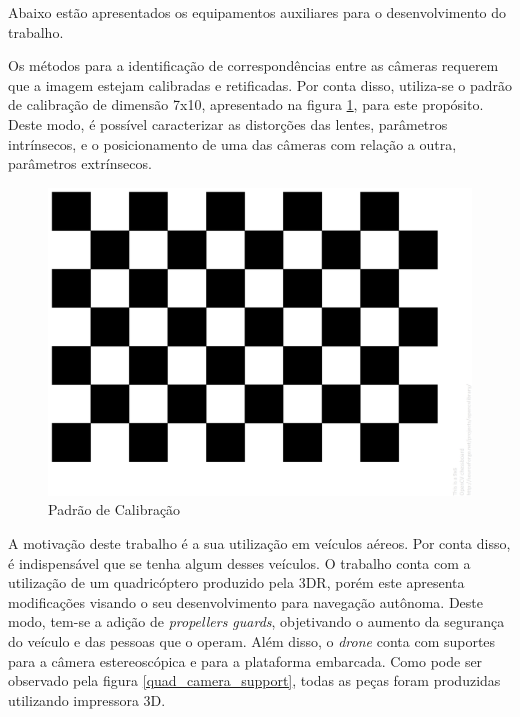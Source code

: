 Abaixo estão apresentados os equipamentos auxiliares para o desenvolvimento do trabalho. 

Os métodos para a identificação de correspondências entre as câmeras requerem que a imagem estejam calibradas e retificadas. Por conta disso, utiliza-se o padrão de calibração de dimensão 7x10, apresentado na figura \ref{calibration_pattern}, para este propósito. Deste modo, é possível caracterizar as distorções das lentes, parâmetros intrínsecos, e o posicionamento de uma das câmeras com relação a outra, parâmetros extrínsecos.  

\begin{figure}[H]
	\centering
	\includegraphics[scale=0.10]{./Resources/calibration_pattern.png}
	\caption{Padrão de Calibração}
	\label{calibration_pattern}
\end{figure}

A motivação deste trabalho é a sua utilização em veículos aéreos. Por conta disso, é indispensável que se tenha algum desses veículos. O trabalho conta com a utilização de um quadricóptero produzido pela 3DR, porém este apresenta modificações visando o seu desenvolvimento para navegação autônoma. Deste modo, tem-se a adição de \textit{propellers guards}, objetivando o aumento da segurança do veículo e das pessoas que o operam. Além disso, o \textit{drone} conta com suportes para a câmera estereoscópica e para a plataforma embarcada. Como pode ser observado pela figura \ref{quad_camera_support}, todas as peças foram produzidas utilizando impressora 3D.

